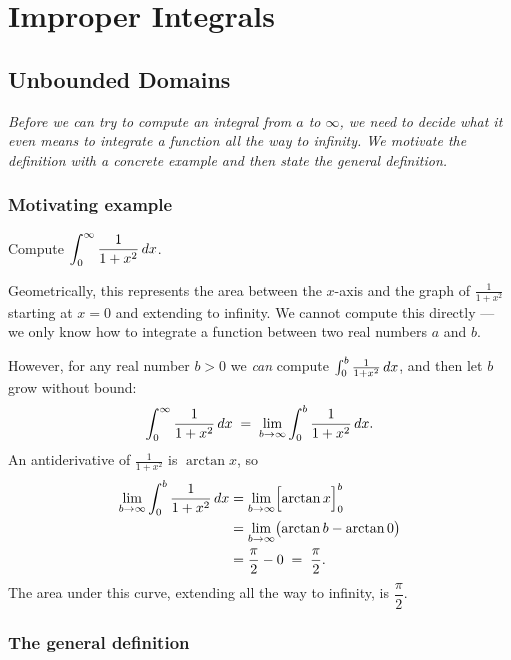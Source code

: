\chapter{Improper Integrals}

\section{Unbounded Domains}
\label{sec:12.1}

\textit{Before we can try to compute an integral from $a$ to $\infty$, we need to decide what it even means to integrate a function all the way to infinity.  We motivate the definition with a concrete example and then state the general definition.}

\subsection*{Motivating example}

\begin{example}
\label{ex:12-1}
Compute $\displaystyle\int_{0}^{\infty}\frac{1}{1+x^{2}}\,dx$.

Geometrically, this represents the area between the $x$-axis and the graph of $\frac{1}{1+x^{2}}$ starting at $x=0$ and extending to infinity.  We cannot compute this directly --- we only know how to integrate a function between two real numbers $a$ and $b$.

However, for any real number $b>0$ we \emph{can} compute $\int_{0}^{b}\frac{1}{1+x^{2}}\,dx$, and then let $b$ grow without bound:
\[
  \int_{0}^{\infty}\frac{1}{1+x^{2}}\,dx
  \;=\; \lim_{b\to\infty}\int_{0}^{b}\frac{1}{1+x^{2}}\,dx.
\]
An antiderivative of $\frac{1}{1+x^{2}}$ is $\arctan x$, so
\begin{align*}
  \lim_{b\to\infty}\int_{0}^{b}\frac{1}{1+x^{2}}\,dx
  &= \lim_{b\to\infty}\Bigl[\arctan x\Bigr]_{0}^{b} \\
  &= \lim_{b\to\infty}\bigl(\arctan b - \arctan 0\bigr) \\
  &= \frac{\pi}{2} - 0 \;=\; \frac{\pi}{2}.
\end{align*}
The area under this curve, extending all the way to infinity, is $\dfrac{\pi}{2}$.
\end{example}

\subsection*{The general definition}

